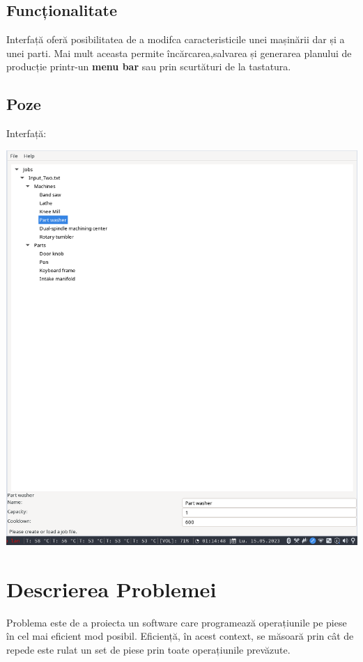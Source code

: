 \documentclass[12pt, twoside]{article}
\begin{document}
\subsection{Funcționalitate}

Interfață oferă posibilitatea de a modifca caracteristicile
unei mașinării dar și a unei parti. Mai mult aceasta permite
încărcarea,salvarea și generarea planului de producție
printr-un \textbf{menu bar} sau prin scurtături de la tastatura.

\subsection{Poze}
Interfață:


\includegraphics[scale=0.5]{interfata.png}
\section{Descrierea Problemei}

Problema este de a proiecta un software care programează
operațiunile pe piese în cel mai eficient mod posibil.
Eficiență, în acest context, se măsoară prin cât de 
repede este rulat un set de piese prin toate operațiunile
prevăzute.
\end{document}
